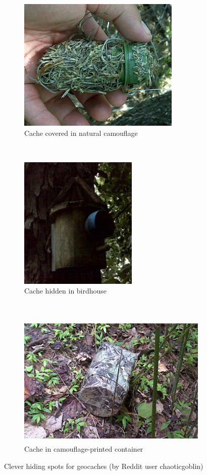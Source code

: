 \begin{figure}[h]
	\centering
	\begin{subfigure}[t]{0.5\textwidth}
		\includegraphics[height=2.5in]{Figures/chaoticgoblin-geocache-covered}
		\caption{Cache covered in natural camouflage}
	\end{subfigure}
	~
	\begin{subfigure}[t]{0.4\textwidth}
		\includegraphics[height=2.5in]{Figures/chaoticgoblin-geocache-birdhouse}
		\caption{Cache hidden in birdhouse}
	\end{subfigure}
	~
	\begin{subfigure}[t]{\textwidth}
		\centering
		\includegraphics[height=2.5in]{Figures/chaoticgoblin-geocache-camo}
		\caption{Cache in camouflage-printed container}
	\end{subfigure}
	\caption{Clever hiding spots for geocaches (by Reddit user chaoticgoblin)}
	\label{fig:geocache-spots}
\end{figure}

